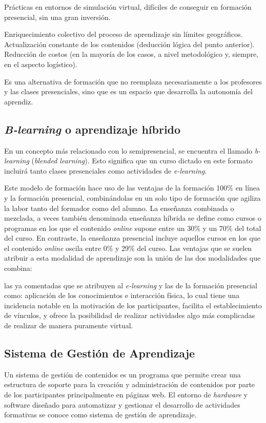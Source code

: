 Prácticas en entornos de simulación virtual, difíciles de conseguir en formación presencial, sin una gran inversión.

Enriquecimiento colectivo del proceso de aprendizaje sin límites geográficos.
Actualización constante de los contenidos (deducción lógica del punto anterior).
Reducción de costos (en la mayoría de los casos, a nivel metodológico y, siempre, en el aspecto logístico).

Es una alternativa de formación que no reemplaza necesariamente a los profesores y las clases presenciales, sino que es un espacio que desarrolla la autonomía del aprendiz.

\subsection{\emph{B-learning} o aprendizaje híbrido}

En un concepto más relacionado con lo semipresencial, se encuentra el llamado \emph{b-learning} (\emph{blended learning}). Esto significa que un curso dictado en este formato incluirá tanto clases presenciales como actividades de \emph{e-learning}.

Este modelo de formación hace uso de las ventajas de la formación 100\% en línea y la formación presencial, combinándolas en un solo tipo de formación que agiliza la labor tanto del formador como del alumno. La enseñanza combinada o mezclada, a veces también denominada enseñanza híbrida se define como cursos o programas en los que el contenido \emph{online} supone entre un 30\% y un 70\% del total del curso. En contraste, la enseñanza presencial incluye aquellos cursos en los que el contenido \emph{online} oscila entre 0\% y 29\% del curso. Las ventajas que se suelen atribuir a esta modalidad de aprendizaje son la unión de las dos modalidades que combina:

las ya comentadas que se atribuyen al \emph{e-learning} y las de la formación presencial como: aplicación de los conocimientos e interacción física, lo cual tiene una incidencia notable en la motivación de los participantes, facilita el establecimiento de vínculos, y ofrece la posibilidad de realizar actividades algo más complicadas de realizar de manera puramente virtual.

\subsection{Sistema de Gestión de Aprendizaje}

Un sistema de gestión de contenidos es un programa que permite crear una estructura de soporte para la creación y administración de contenidos por parte de los participantes principalmente en páginas web. El entorno de \emph{hardware} y software diseñado para automatizar y gestionar el desarrollo de actividades formativas se conoce como sistema de gestión de aprendizaje.

